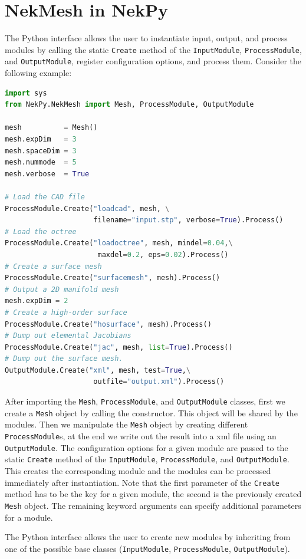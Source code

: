 \section{NekMesh in NekPy}

The Python interface allows the user to instantiate input,
output, and process modules by calling the static \verb+Create+ method of the
\verb+InputModule+, \verb+ProcessModule+, and \verb+OutputModule+,
register configuration options, and process them.
Consider the following example:

\begin{lstlisting}[style=C++Style, language=Python]
import sys
from NekPy.NekMesh import Mesh, ProcessModule, OutputModule

mesh          = Mesh()
mesh.expDim   = 3
mesh.spaceDim = 3
mesh.nummode  = 5
mesh.verbose  = True

# Load the CAD file
ProcessModule.Create("loadcad", mesh, \
                     filename="input.stp", verbose=True).Process()
# Load the octree
ProcessModule.Create("loadoctree", mesh, mindel=0.04,\
                      maxdel=0.2, eps=0.02).Process()
# Create a surface mesh
ProcessModule.Create("surfacemesh", mesh).Process()
# Output a 2D manifold mesh
mesh.expDim = 2
# Create a high-order surface
ProcessModule.Create("hosurface", mesh).Process()
# Dump out elemental Jacobians
ProcessModule.Create("jac", mesh, list=True).Process()
# Dump out the surface mesh.
OutputModule.Create("xml", mesh, test=True,\
                     outfile="output.xml").Process()
\end{lstlisting}

After importing the \verb+Mesh+, \verb+ProcessModule+, and \verb+OutputModule+
classes, first we create a \verb+Mesh+ object by calling the constructor.
This object will be shared by the modules.
Then we manipulate the \verb+Mesh+ object by creating different
\verb+ProcessModule+s, at the end we write out the result into a xml file
using an \verb+OutputModule+.
The configuration options for a given module are passed to the static
\verb+Create+ method of the \verb+InputModule+, \verb+ProcessModule+, and
\verb+OutputModule+. This creates the corresponding module and the
modules can be processed immediately after instantiation. Note that the first
parameter of the \verb+Create+ method has to be the key for a given module,
the second is the previously created \verb+Mesh+ object. The remaining keyword
arguments can specify additional parameters for a module.

The Python interface allows the user to create new modules by inheriting from
one of the possible base classes
(\verb+InputModule+, \verb+ProcessModule+, \verb+OutputModule+).

